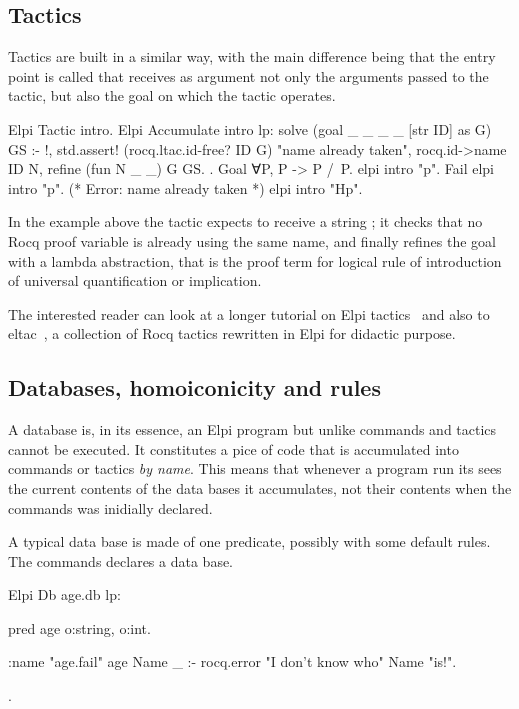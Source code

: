\documentclass[a4paper, 11pt]{book}
\begin{document}
\subsection{Tactics}

Tactics are built in a similar way, with the main difference being that
the entry point is called  that receives as
argument not only the arguments passed to the tactic, but also the goal
on which the tactic operates.

\begin{rocqcode}
Elpi Tactic intro.
Elpi Accumulate intro lp:{{
  solve (goal _ _ _ _ [str ID] as G) GS :- !,
    std.assert! (rocq.ltac.id-free? ID G) "name already taken",
    rocq.id->name ID N,
    refine (fun N _ _) G GS.
}}.
Goal ∀P, P -> P /\ P.
elpi intro "p".
Fail elpi intro "p". (* Error: name already taken *)
elpi intro "Hp".
\end{rocqcode}

In the example above the tactic expects to receive a string ;
it checks that no Rocq proof variable is already using the same name, and
finally refines the goal with a lambda abstraction, that is the proof term
for logical rule of introduction of universal quantification or implication.
  
The interested reader can look at a longer tutorial on Elpi tactics~\cite{tuto:tactics}
and also to eltac~\cite{app:eltac}, a collection of Rocq tactics rewritten in Elpi for
didactic purpose.

\subsection{Databases, homoiconicity and rules}\label{sec:homo}

A database is, in its essence, an Elpi program but unlike commands and
tactics cannot be executed. It constitutes a pice of code that is
accumulated into commands or tactics \emph{by name}. This means that
whenever a program run its sees the current contents of the data bases
it accumulates, not their contents when the commands was inidially declared.

A typical data base is made of one predicate, possibly with some default
rules. The  commands declares a data base.

\begin{rocqcode}
Elpi Db age.db lp:{{
  pred age o:string, o:int.

  :name "age.fail"
  age Name _ :- rocq.error "I don't know who" Name "is!".
}}.
\end{rocqcode}
\end{document}
